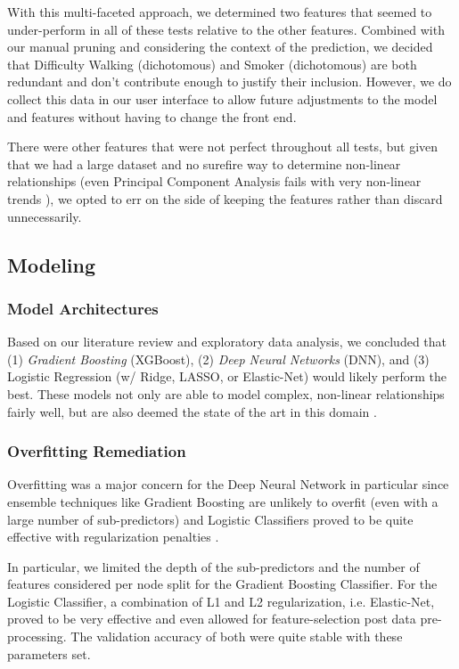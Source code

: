 \documentclass[conference]{IEEEtran}
\begin{document}
    With this multi-faceted approach, we determined two features that seemed to under-perform in all of these tests relative to the other features. Combined with our manual pruning and considering the context of the prediction, we decided that Difficulty Walking (dichotomous) and Smoker (dichotomous) are both redundant and don’t contribute enough to justify their inclusion. However, we do collect this data in our user interface to allow future adjustments to the model and features without having to change the front end.
    
    There were other features that were not perfect throughout all tests, but given that we had a large dataset and no surefire way to determine non-linear relationships (even Principal Component Analysis fails with very non-linear trends \cite{b5}), we opted to err on the side of keeping the features rather than discard unnecessarily.
    
    \subsection{Modeling}
        \subsubsection{Model Architectures}
        Based on our literature review and exploratory data analysis, we concluded that (1) \textit{Gradient Boosting} (XGBoost), (2) \textit{Deep Neural Networks} (DNN), and (3) Logistic Regression (w/ Ridge, LASSO, or Elastic-Net) would likely perform the best. These models not only are able to model complex, non-linear relationships fairly well, but are also deemed the state of the art in this domain \cite{b2}.

        \subsubsection{Overfitting Remediation}
        Overfitting was a major concern for the Deep Neural Network in particular since ensemble techniques like Gradient Boosting are unlikely to overfit (even with a large number of sub-predictors) and Logistic Classifiers proved to be quite effective with regularization penalties \cite{b7}.
        
        In particular, we limited the depth of the sub-predictors and the number of features considered per node split for the Gradient Boosting Classifier. For the Logistic Classifier, a combination of L1 and L2 regularization, i.e. Elastic-Net, proved to be very effective and even allowed for feature-selection post data pre-processing. The validation accuracy of both were quite stable with these parameters set.
\end{document}
